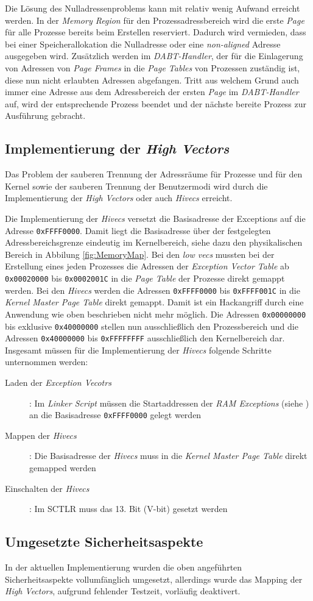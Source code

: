 Die Lösung des Nulladressenproblems kann mit relativ wenig Aufwand erreicht werden. In der \textit{Memory Region} für den Prozessadressbereich wird die erste \textit{Page} für alle Prozesse bereits beim Erstellen reserviert. Dadurch wird vermieden, dass bei einer Speicherallokation die Nulladresse oder eine \textit{non-aligned} Adresse ausgegeben wird. Zusätzlich werden im \textit{DABT-Handler}, der für die Einlagerung von Adressen von \textit{Page Frames} in die \textit{Page Tables} von Prozessen zuständig ist, diese nun nicht erlaubten Adressen abgefangen. Tritt aus welchem Grund auch immer eine Adresse aus dem Adressbereich der ersten \textit{Page} im \textit{DABT-Handler} auf, wird der entsprechende Prozess beendet und der nächste bereite Prozess zur Ausführung gebracht.

\subsection{Implementierung der \textit{High Vectors}}

Das Problem der sauberen Trennung der Adressräume für Prozesse und für den Kernel sowie der sauberen Trennung der Benutzermodi wird durch die Implementierung der \textit{High Vectors} oder auch \textit{Hivecs} erreicht.

Die Implementierung der \textit{Hivecs} versetzt die Basisadresse der Exceptions auf die Adresse \texttt{0xFFFF0000}. Damit liegt die Basisadresse über der festgelegten Adressbereichsgrenze eindeutig im Kernelbereich, siehe dazu den physikalischen Bereich in Abbilung \ref{fig:MemoryMap}. Bei den \textit{low vecs} mussten bei der Erstellung eines jeden Prozesses die Adressen der \textit{Exception Vector Table} ab \texttt{0x00020000} bis \texttt{0x0002001C} in die \textit{Page Table} der Prozesse direkt gemappt werden. Bei den \textit{Hivecs} werden die Adressen \texttt{0xFFFF0000} bis \texttt{0xFFFF001C} in die \textit{Kernel Master Page Table} direkt gemappt. Damit ist ein Hackangriff durch eine Anwendung wie oben beschrieben nicht mehr möglich. Die Adressen \texttt{0x00000000} bis exklusive \texttt{0x40000000} stellen nun ausschließlich den Prozessbereich und die Adressen \texttt{0x40000000} bis \texttt{0xFFFFFFFF} ausschließlich den Kernelbereich dar.
Insgesamt müssen für die Implementierung der \textit{Hivecs} folgende Schritte unternommen werden:

\begin{description}
	\item[Laden der \textit{Exception Vecotrs}]: Im \textit{Linker Script} müssen die Startaddressen der \textit{RAM Exceptions} (siehe \cite[S. 4100]{ARM:TRM}) an die Basisadresse \texttt{0xFFFF0000} gelegt werden
	\item[Mappen der \textit{Hivecs}]: Die Basisadresse der \textit{Hivecs} muss in die \textit{Kernel Master Page Table} direkt gemapped werden
	\item[Einschalten der \textit{Hivecs}]: Im \ac{SCTLR} muss das 13. Bit (V-bit) gesetzt werden \cite[S. 1164]{ARM:ARM} 
\end{description}

\subsection{Umgesetzte Sicherheitsaspekte}
In der aktuellen Implementierung wurden die oben angeführten Sicherheitsaspekte vollumfänglich umgesetzt, allerdings wurde das Mapping der \textit{High Vectors}, aufgrund fehlender Testzeit, vorläufig deaktivert.
\pagebreak 